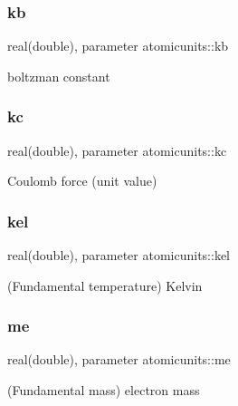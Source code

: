 \mbox{\label{namespaceatomicunits_afe876defe82137d91908691c6765a5f1}} 
\subsubsection{\texorpdfstring{kb}{kb}}
{\footnotesize\ttfamily real(double), parameter atomicunits\+::kb}



boltzman constant 

\mbox{\label{namespaceatomicunits_aafc175708d34f52459448530cdec9aae}} 
\subsubsection{\texorpdfstring{kc}{kc}}
{\footnotesize\ttfamily real(double), parameter atomicunits\+::kc}



Coulomb force (unit value) 

\mbox{\label{namespaceatomicunits_a0b4d6ac453558bc86022587236f7d076}} 
\subsubsection{\texorpdfstring{kel}{kel}}
{\footnotesize\ttfamily real(double), parameter atomicunits\+::kel}



(Fundamental temperature) Kelvin 

\mbox{\label{namespaceatomicunits_a02f36d49c4a56d1cc84c8cda6c631a68}} 
\subsubsection{\texorpdfstring{me}{me}}
{\footnotesize\ttfamily real(double), parameter atomicunits\+::me}



(Fundamental mass) electron mass 

\mbox{\label{namespaceatomicunits_a001e0a01ab152644eb7df31ade44b290}} 
